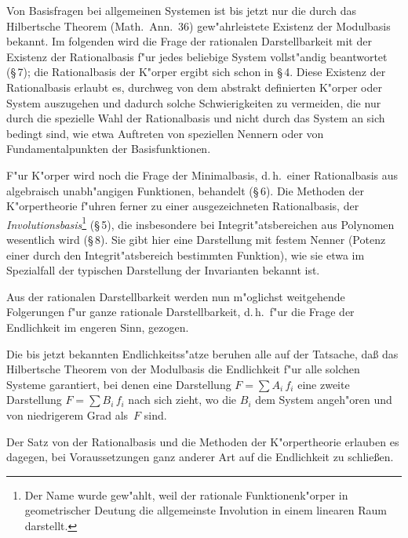 \documentclass[11pt,a4paper]{article}
\begin{document}
Von Basisfragen bei allgemeinen Systemen ist bis jetzt nur die durch
das Hilbertsche Theorem (Math.\ Ann.\ 36) gew"{a}hrleistete Existenz der
Modulbasis bekannt. Im folgenden wird die Frage der rationalen Darstellbarkeit
mit der Existenz der Rationalbasis f"{u}r jedes beliebige System vollst"{a}ndig
beantwortet (\S\,7); die Rationalbasis der K"{o}rper ergibt sich schon
in \S\,4. Diese Existenz der Rationalbasis erlaubt es, durchweg von dem
abstrakt definierten K"{o}rper oder System auszugehen und dadurch solche
Schwierigkeiten zu vermeiden, die nur durch die spezielle Wahl der
Rationalbasis und nicht durch das System an sich bedingt sind, wie etwa
Auftreten von speziellen Nennern oder von Fundamentalpunkten der
Basisfunktionen.

F"{u}r K"{o}rper wird noch die Frage der Minimalbasis, d.\,h.\ einer
Rationalbasis aus algebraisch unabh"{a}ngigen Funktionen, behandelt (\S\,6).
Die Methoden der K"{o}rpertheorie f"{u}hren ferner zu einer ausgezeichneten
Rationalbasis, der \emph{Involutionsbasis}\footnote{Der Name wurde gew"{a}hlt, weil der
rationale Funktionenk"{o}rper in geometrischer Deutung die allgemeinste Involution
in einem linearen Raum darstellt.} (\S\,5), die insbesondere bei Integrit"{a}tsbereichen
aus Polynomen wesentlich wird (\S\,8). Sie gibt hier eine Darstellung mit
festem Nenner (Potenz einer durch den Integrit"{a}tsbereich bestimmten Funktion),
wie sie etwa im Spezialfall der typischen Darstellung der Invarianten bekannt ist.

Aus der rationalen Darstellbarkeit werden nun m"{o}glichst weitgehende
Folgerungen f"{u}r ganze rationale Darstellbarkeit, d.\,h.\ f"{u}r die Frage der
Endlichkeit im engeren Sinn, gezogen.

Die bis jetzt bekannten Endlichkeitss"{a}tze beruhen alle auf der Tatsache,
da\ss{} das Hilbertsche Theorem von der Modulbasis die Endlichkeit
f"{u}r alle solchen Systeme garantiert, bei denen eine Darstellung
$F = \sum A_{i}\,f_{i}$
eine zweite Darstellung
$F = \sum B_{i}\,f_{i}$
nach sich zieht, wo die $B_{i}$ dem System angeh"{o}ren und von niedrigerem
Grad als~$F$ sind.

Der Satz von der Rationalbasis und die Methoden der K"{o}rpertheorie
erlauben es dagegen, bei Voraussetzungen ganz anderer Art auf die Endlichkeit
zu schlie\ss{}en.
\end{document}
